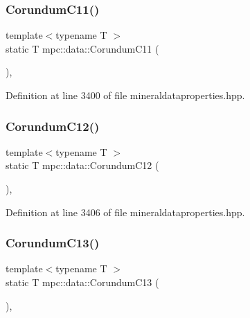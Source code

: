 \subsubsection{\texorpdfstring{Corundum\+C11()}{CorundumC11()}}
{\footnotesize\ttfamily template$<$typename T $>$ \\
static T mpc\+::data\+::\+Corundum\+C11 (\begin{DoxyParamCaption}{ }\end{DoxyParamCaption})\hspace{0.3cm}{\ttfamily [inline]}, {\ttfamily [static]}}



Definition at line 3400 of file mineraldataproperties.\+hpp.

\mbox{\label{namespacempc_1_1data_a9d7f843187d5ea95988e104c3329609f}} 
\subsubsection{\texorpdfstring{Corundum\+C12()}{CorundumC12()}}
{\footnotesize\ttfamily template$<$typename T $>$ \\
static T mpc\+::data\+::\+Corundum\+C12 (\begin{DoxyParamCaption}{ }\end{DoxyParamCaption})\hspace{0.3cm}{\ttfamily [inline]}, {\ttfamily [static]}}



Definition at line 3406 of file mineraldataproperties.\+hpp.

\mbox{\label{namespacempc_1_1data_a7b2d2fec09cb330724cfccb23e3be64b}} 
\subsubsection{\texorpdfstring{Corundum\+C13()}{CorundumC13()}}
{\footnotesize\ttfamily template$<$typename T $>$ \\
static T mpc\+::data\+::\+Corundum\+C13 (\begin{DoxyParamCaption}{ }\end{DoxyParamCaption})\hspace{0.3cm}{\ttfamily [inline]}, {\ttfamily [static]}}




